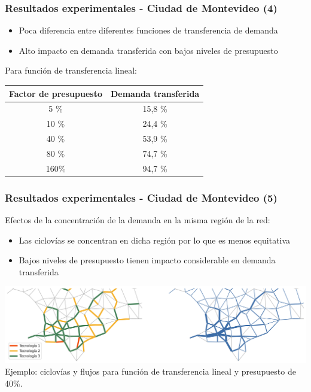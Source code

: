 \documentclass[aspectratio=43, 10pt]{beamer}
\begin{document}
\begin{frame}
    \frametitle{Resultados experimentales - Ciudad de Montevideo (4)}

    \begin{itemize}
        \item{Poca diferencia entre diferentes funciones de transferencia de demanda}
        \item{Alto impacto en demanda transferida con bajos niveles de presupuesto}
    \end{itemize}

    Para función de transferencia lineal:
    \begin{center}
        \begin{tabular}{c c}
            \hline
            Factor de presupuesto & Demanda transferida \\
            \hline
            \hline
            5  \% & 15,8 \% \\
            10 \% & 24,4 \% \\
            40 \% & 53,9 \% \\
            80 \% & 74,7 \% \\
            160\% & 94,7 \% \\
            \hline
        \end{tabular}
    \end{center}
\end{frame}

\begin{frame}
    \frametitle{Resultados experimentales - Ciudad de Montevideo (5)}

    Efectos de la concentración de la demanda en la misma región de la red:

    \begin{itemize}
        \item{Las ciclovías se concentran en dicha región por lo que es menos equitativa}
        \item{Bajos niveles de presupuesto tienen impacto considerable en demanda transferida}
    \end{itemize}

    \includegraphics[width=\textwidth]{images/mdeo_0.4_results.png}
    \small
    Ejemplo: ciclovías y flujos para función de transferencia lineal y presupuesto de 40\%.
\end{frame}
\end{document}
